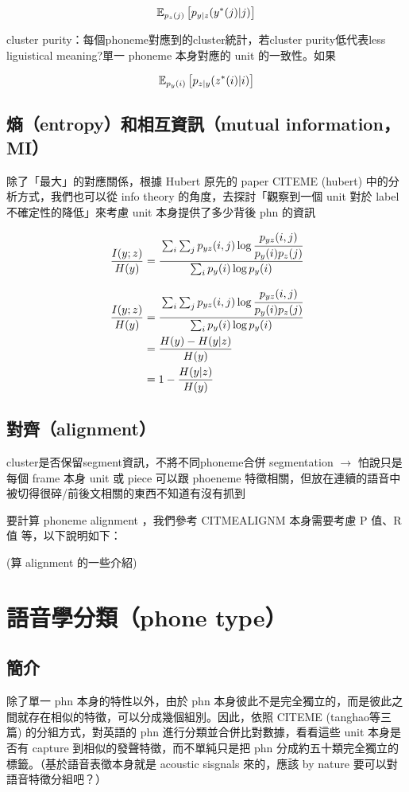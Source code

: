 $$\mathbb{E}_{p_z(j)}\left[p_{y|z}(y^*(j)|j) \right]$$

cluster purity：每個phoneme對應到的cluster統計，若cluster purity低代表less liguistical meaning?單一 phoneme 本身對應的 unit 的一致性。如果

$$\mathbb{E}_{p_y(i)}\left[p_{z|y}(z^*(i)|i) \right]$$

\subsection{熵（entropy）和相互資訊（mutual information，MI）}

除了「最大」的對應關係，根據 Hubert 原先的 paper CITEME (hubert) 中的分析方式，我們也可以從 info theory 的角度，去探討「觀察到一個 unit 對於 label 不確定性的降低」來考慮 unit 本身提供了多少背後 phn 的資訊

$$\frac{I(y;z)}{H(y)}=\cfrac{\sum_i \sum_j p_{yz}(i, j) \log \cfrac{p_{yz}(i, j)}{p_y(i)p_z(j)}}{\sum_i p_y(i) \log p_y(i)}$$

\begin{align}
\frac{I(y;z)}{H(y)}&=\cfrac{\sum_i \sum_j p_{yz}(i, j) \log \cfrac{p_{yz}(i, j)}{p_y(i)p_z(j)}}{\sum_i p_y(i) \log p_y(i)} \\
&=\frac{H(y)-H(y|z)}{H(y)} \\
&=1-\frac{H(y|z)}{H(y)}
\end{align}



\subsection{對齊（alignment）}
cluster是否保留segment資訊，不將不同phoneme合併
segmentation $\rightarrow$
怕說只是每個 frame 本身 unit 或 piece 可以跟 phoeneme 特徵相關，但放在連續的語音中被切得很碎/前後文相關的東西不知道有沒有抓到

要計算 phoneme alignment ，我們參考 CITMEALIGNM 本身需要考慮 P 值、R 值 等，以下說明如下：

(算 alignment 的一些介紹)

\section{語音學分類（phone type）}

\subsection{簡介}

除了單一 phn 本身的特性以外，由於 phn 本身彼此不是完全獨立的，而是彼此之間就存在相似的特徵，可以分成幾個組別。因此，依照 CITEME (tanghao等三篇) 的分組方式，對英語的 phn 進行分類並合併比對數據，看看這些 unit 本身是否有 capture 到相似的發聲特徵，而不單純只是把 phn 分成約五十類完全獨立的標籤。（基於語音表徵本身就是 acoustic sisgnals 來的，應該 by nature 要可以對語音特徵分組吧？）

